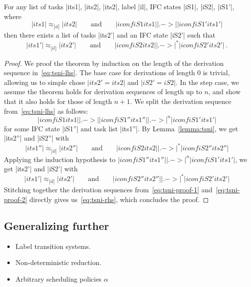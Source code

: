 \begin{lemma}
  \label{lemma:tsni}
  For any list of tasks |its1|, |its2|, |its2|, label |il|,
  IFC states |iS1|, |iS2|, |iS1'|, where
  \begin{equation} \label{eq:tsni-lemma-lhs}
  |its1| \approx_{|il|} |its2|
  \qquad \text{and} \qquad
  |iconf iS1 its1| |.->| |iconf iS1' its1'|
  \end{equation}
  then there exists a list of tasks |its2'| and an IFC state |iS2'| such that
  \begin{equation} \label{eq:tsni-lemma-rhs}
  |its1'| \approx_{|il|} |its2'|
  \qquad \text{and} \qquad
  |iconf iS2 its2| |.->|^* |iconf iS2' its2'|
  \ \text{.}
  \end{equation}
\end{lemma}

\begin{proof}
  We proof the theorem by induction on the length of the derivation sequence in~\eqref{eq:tsni-lhs}.
  The base case for derivations
  of length 0 is trivial, allowing
  us to simple chose $|its2'=its2|$ and $|iS2'=iS2|$.  In the step case, we assume
  the theorem holds for derivation sequences of length up to $n$, and show that it also
  holds for those of length $n+1$.  We split the derivation sequence from~\eqref{eq:tsni-lhs} as follows:
  \[
  |iconf iS1 its1| |.->| |iconf iS1'' its1''| |.->|^n |iconf iS1' its1'|
  \]
  for some IFC state |iS1''| and task list |its1''|.  By Lemma~\ref{lemma:tsni}, we get
  |its2''| and |iS2''| with
  \begin{equation} \label{eq:tsni-proof-1}
  |its1''| \approx_{|il|} |its2''|
  \qquad \text{and} \qquad
  |iconf iS2 its2| |.->|^* |iconf iS2'' its2''|
  \end{equation}
  Applying the induction hypothesis to
  $|iconf iS1'' its1''| |.->|^n |iconf iS1' its1'|$, we get |its2'| and |iS2'| with
  \begin{equation} \label{eq:tsni-proof-2}
  |its1'| \approx_{|il|} |its2'|
  \qquad \text{and} \qquad
  |iconf iS2'' its2''| |.->|^* |iconf iS2' its2'|
  \end{equation}
  Stitching together the derivation sequences from~\eqref{eq:tsni-proof-1} and~\eqref{eq:tsni-proof-2} directly gives
  us~\eqref{eq:tsni-rhs}, which concludes the proof.
\end{proof}

\subsection{Generalizing further}

\begin{itemize}
\item Label transition systems.
\item Non-deterministic reduction.
\item Arbitrary scheduling policies $\alpha$
\end{itemize}











